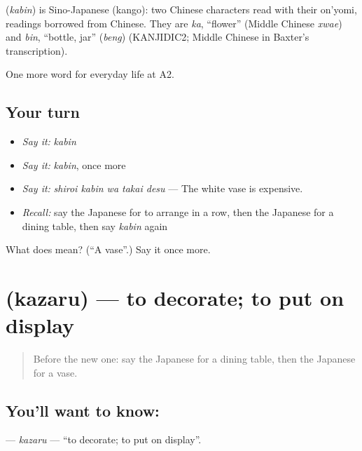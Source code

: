 \begin{cousinweb}
\textbf{} (\emph{kabin}) is Sino-Japanese (kango): two Chinese characters read with their on'yomi, readings borrowed from Chinese. They are \emph{ka}, \textquotedblleft{}flower\textquotedblright{} (Middle Chinese \emph{xwae}) and \emph{bin}, \textquotedblleft{}bottle, jar\textquotedblright{} (\emph{beng}) (KANJIDIC2; Middle Chinese in Baxter's transcription).
\end{cousinweb}

\begin{grammarlens}[title={What you've built}]
One more word for everyday life at A2.
\end{grammarlens}

\subsection*{Your turn}
\begin{itemize}
\raggedright
  \item \emph{Say it:} \emph{kabin}
  \item \emph{Say it:} \emph{kabin}, once more
  \item \emph{Say it:} \emph{shiroi kabin wa takai desu} — The white vase is expensive.
  \item \emph{Recall:} say the Japanese for to arrange in a row, then the Japanese for a dining table, then say \emph{kabin} again
\end{itemize}

\begin{tcolorbox}[breakable,colback=teal!4,colframe=teal!35!black,title={Before you move on}]
What does  mean? (\textquotedblleft{}A vase\textquotedblright{}.) Say it once more.
\end{tcolorbox}
\section[\texorpdfstring{\ja{かざる} (kazaru)}{かざる (kazaru)}]{ (kazaru) — to decorate; to put on display}

\label{lesson:JA-C157-kazaru}



\begin{quote}
Before the new one: say the Japanese for a dining table, then the Japanese for a vase.
\end{quote}

\subsection*{You'll want to know: }
\textbf{} — \emph{kazaru} — \textquotedblleft{}to decorate; to put on display\textquotedblright{}.

